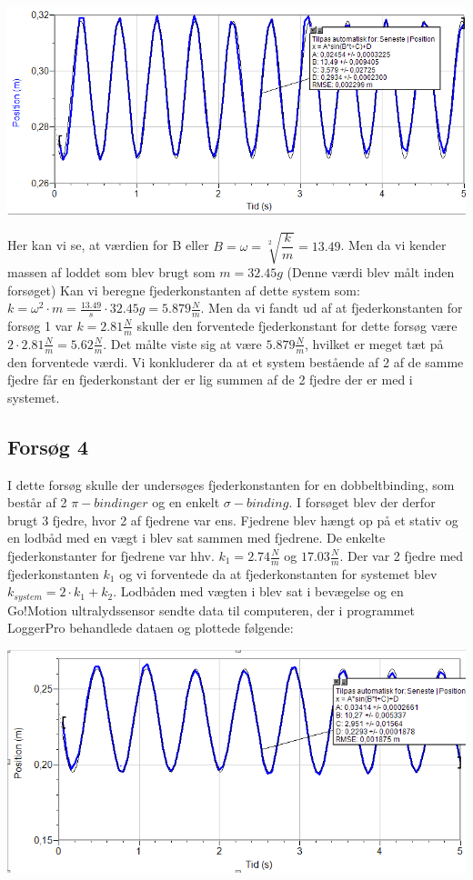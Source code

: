 \begin{center}
\includegraphics[scale=0.7]{Billeder/graf3}
\end{center}

Her kan vi se, at værdien for B eller $B = \omega = \sqrt[2]{\dfrac{k}{m}}=13.49$. Men da vi kender massen af loddet som blev brugt som $m=32.45g$ (Denne værdi blev målt inden forsøget) Kan vi beregne fjederkonstanten af dette system som:
$k=\omega^2 \cdot m = \frac{13.49}{s} \cdot 32.45g = 5.879 \frac{N}{m}$. Men da vi fandt ud af at fjederkonstanten for forsøg 1 var $k=2.81\frac{N}{m}$ skulle den forventede fjederkonstant for dette forsøg være $2 \cdot 2.81 \frac{N}{m}= 5.62 \frac{N}{m}$. Det målte viste sig at være $5.879 \frac{N}{m}$, hvilket er meget tæt på den forventede værdi. Vi konkluderer da at et system bestående af 2 af de samme fjedre får en fjederkonstant der er lig summen af de 2 fjedre der er med i systemet. 

\subsection{Forsøg 4}
I dette forsøg skulle der undersøges fjederkonstanten for en dobbeltbinding, som består af 2 $\pi-bindinger$ og en enkelt $\sigma-binding$. I forsøget blev der derfor brugt 3 fjedre, hvor 2 af fjedrene var ens. Fjedrene blev hængt op på et stativ og en lodbåd med en vægt i blev sat sammen med fjedrene. De enkelte fjederkonstanter for fjedrene var hhv. $k_1 = 2.74 \frac{N}{m} $ og $17.03 \frac{N}{m}$. Der var 2 fjedre med fjederkonstanten $k_1$ og vi forventede da at fjederkonstanten for systemet blev $k_{system}= 2 \cdot k_1 + k_2$. Lodbåden med vægten i blev sat i bevægelse og en Go!Motion ultralydssensor sendte data til computeren, der i programmet LoggerPro behandlede dataen og plottede følgende:

\begin{center}
\includegraphics[scale=0.7]{Billeder/graf4}
\end{center}